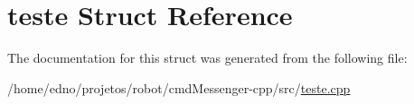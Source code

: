 \hypertarget{structteste}{\section{teste Struct Reference}
\label{structteste}
}


The documentation for this struct was generated from the following file\+:\begin{DoxyCompactItemize}
\item 
/home/edno/projetos/robot/cmd\+Messenger-\/cpp/src/\hyperlink{teste_8cpp}{teste.\+cpp}\end{DoxyCompactItemize}

